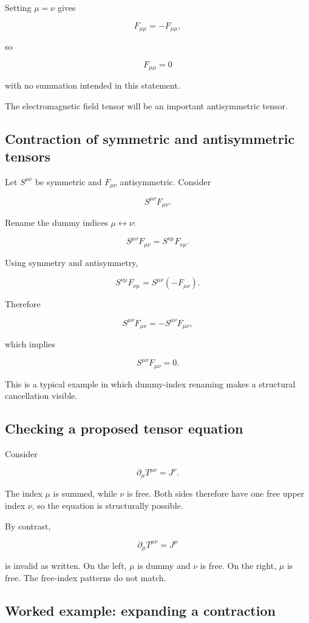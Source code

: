 Setting \(\mu=\nu\) gives

\[
F_{\mu\mu}=-F_{\mu\mu},
\]

so

\[
\boxed{
F_{\mu\mu}=0
}
\]

with no summation intended in this statement.

The electromagnetic field tensor will be an important antisymmetric tensor.

\subsection{Contraction of symmetric and antisymmetric tensors}

Let \(S^{\mu\nu}\) be symmetric and \(F_{\mu\nu}\) antisymmetric. Consider

\[
S^{\mu\nu}F_{\mu\nu}.
\]

Rename the dummy indices \(\mu\leftrightarrow\nu\):

\[
S^{\mu\nu}F_{\mu\nu}
=
S^{\nu\mu}F_{\nu\mu}.
\]

Using symmetry and antisymmetry,

\[
S^{\nu\mu}F_{\nu\mu}
=
S^{\mu\nu}(-F_{\mu\nu}).
\]

Therefore

\[
S^{\mu\nu}F_{\mu\nu}
=
-S^{\mu\nu}F_{\mu\nu},
\]

which implies

\[
\boxed{
S^{\mu\nu}F_{\mu\nu}=0
}.
\]

This is a typical example in which dummy-index renaming makes a structural cancellation visible.

\subsection{Checking a proposed tensor equation}

Consider

\[
\partial_{\mu}T^{\mu\nu}=J^{\nu}.
\]

The index \(\mu\) is summed, while \(\nu\) is free. Both sides therefore have one free upper index \(\nu\), so the equation is structurally possible.

By contrast,

\[
\partial_{\mu}T^{\mu\nu}=J^{\mu}
\]

is invalid as written. On the left, \(\mu\) is dummy and \(\nu\) is free. On the right, \(\mu\) is free. The free-index patterns do not match.

\subsection{Worked example: expanding a contraction}

